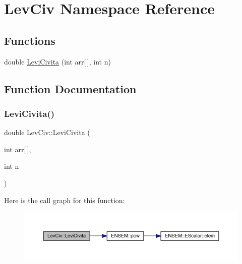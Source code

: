\hypertarget{namespaceLevCiv}{}\section{Lev\+Civ Namespace Reference}
\label{namespaceLevCiv}
\subsection*{Functions}
\begin{DoxyCompactItemize}
\item 
double \mbox{\hyperlink{namespaceLevCiv_adf1ae0fe71d3a8851d6ec4bd21ef4907}{Levi\+Civita}} (int arr\mbox{[}$\,$\mbox{]}, int n)
\end{DoxyCompactItemize}


\subsection{Function Documentation}
\mbox{\label{namespaceLevCiv_adf1ae0fe71d3a8851d6ec4bd21ef4907}} 
\subsubsection{\texorpdfstring{LeviCivita()}{LeviCivita()}}
{\footnotesize\ttfamily double Lev\+Civ\+::\+Levi\+Civita (\begin{DoxyParamCaption}\item[{int}]{arr\mbox{[}$\,$\mbox{]},  }\item[{int}]{n }\end{DoxyParamCaption})}

Here is the call graph for this function\+:\nopagebreak
\begin{figure}[H]
\begin{center}
\leavevmode
\includegraphics[width=350pt]{d3/df8/namespaceLevCiv_adf1ae0fe71d3a8851d6ec4bd21ef4907_cgraph}
\end{center}
\end{figure}
